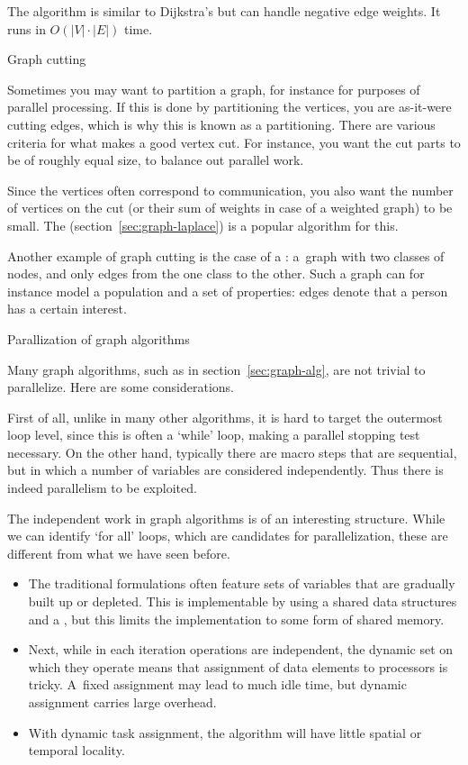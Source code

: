 The  algorithm is similar to Dijkstra's but can
handle negative edge weights.
It runs in $O\left(|V|\cdot |E|\right)$ time.

 {Graph cutting}

Sometimes you may want to partition a graph, for instance for purposes
of parallel processing. If this is done by partitioning the vertices,
you are as-it-were cutting edges, which is why this is known as a
 partitioning. There are various criteria for
what makes a good vertex cut.
For instance, you want the cut parts to
be of roughly equal size, to balance out parallel work.

Since the
vertices often correspond to communication,
you also want the number of vertices on the cut
(or their sum of weights in case of a weighted graph)
to be small.
The  (section~\ref{sec:graph-laplace})
is a popular algorithm for this.

Another example of graph cutting is the case of a
: a~graph with two classes of nodes,
and only edges from the one class to the other. Such a graph can for
instance model a population and a set of properties: edges denote that
a person has a certain interest.

 {Parallization of graph algorithms}

Many graph algorithms, such as in section~\ref{sec:graph-alg}, are not
trivial to parallelize. Here are some considerations.


First of all, unlike in many other algorithms, it is hard to target
the outermost loop level, since this is often a `while' loop, making a
parallel stopping test necessary.  On the other hand, typically there
are macro steps that are sequential, but in which a number of
variables are considered independently. Thus there is indeed
parallelism to be exploited.

The independent work in graph algorithms is of an interesting
structure.  While we can identify `for all' loops, which are
candidates for parallelization, these are different from what we have
seen before.
%
\begin{itemize}
\item The traditional formulations often feature sets of variables
  that are gradually built up or depleted. This is implementable by
  using a shared data structures and a , but this limits the
  implementation to some form of shared memory.
\item
  Next, while in each iteration operations are independent, the dynamic
  set on which they operate means that assignment of data
  elements to processors is tricky.
  A~fixed assignment may lead to much idle time, but dynamic
  assignment carries large overhead.
\item With dynamic task assignment, the algorithm
  will have little spatial or temporal locality.
\end{itemize}

